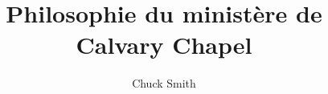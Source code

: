 \documentclass[paper=5.5in:8.5in,pagesize=pdftex,14pt]{scrbook}
\title{Philosophie du ministère de Calvary Chapel}
\author{Chuck Smith}
\begin{document}
\maketitle




\renewcommand*{\BRbooktitlestyle}[1]{\emph{#1}\vadjust{\nobreak}}
\makeatletter
\def\imki@firstpagestyle{empty}
\makeatother
\printindex
\end{document}

